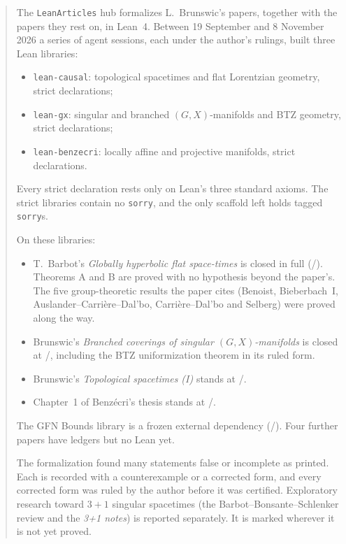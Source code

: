 \begin{abstract}
The \texttt{LeanArticles} hub formalizes L.~Brunswic's papers, together with the papers they rest
on, in Lean~4. Between 19 September and 8 November 2026 a series of agent sessions, each under the
author's rulings, built three Lean libraries:
\begin{itemize}
\item \texttt{lean-causal}: topological spacetimes and flat Lorentzian geometry,
  \numPkgCausalDecls{} strict declarations;
\item \texttt{lean-gx}: singular and branched $(G,X)$-manifolds and BTZ geometry,
  \numPkgGxDecls{} strict declarations;
\item \texttt{lean-benzecri}: locally affine and projective manifolds,
  \numPkgBenzecriDecls{} strict declarations.
\end{itemize}
Every strict declaration rests only on Lean's three standard axioms. The strict libraries contain
no \texttt{sorry}, and the only scaffold left holds \numPkgCausalSorryscaffold{} tagged
\texttt{sorry}s.

On these libraries:
\begin{itemize}
\item T.~Barbot's \emph{Globally hyperbolic flat space-times} is closed in full
  (\numBarbotClosed/\numBarbotTarget). Theorems A and B are proved with no hypothesis beyond the
  paper's. The five group-theoretic results the paper cites (Benoist, Bieberbach~I,
  Auslander--Carrière--Dal'bo, Carrière--Dal'bo and Selberg) were proved along the way.
\item Brunswic's \emph{Branched coverings of singular $(G,X)$-manifolds} is closed at
  \numGxClosed/\numGxTarget, including the BTZ uniformization theorem in its ruled form.
\item Brunswic's \emph{Topological spacetimes (I)} stands at \numEttClosed/\numEttTarget.
\item Chapter~1 of Benzécri's thesis stands at \numBenzecriClosed/\numBenzecriTarget.
\end{itemize}
The GFN Bounds library is a frozen external dependency (\numGfnClosed/\numGfnStatements). Four
further papers have ledgers but no Lean yet.

The formalization found many statements false or incomplete as printed. Each is recorded with a
counterexample or a corrected form, and every corrected form was ruled by the author before it
was certified. Exploratory research toward $3+1$ singular spacetimes (the Barbot--Bonsante--Schlenker
review and the \emph{3+1 notes}) is reported separately. It is marked \unv{} wherever it is not
yet proved.
\end{abstract}

